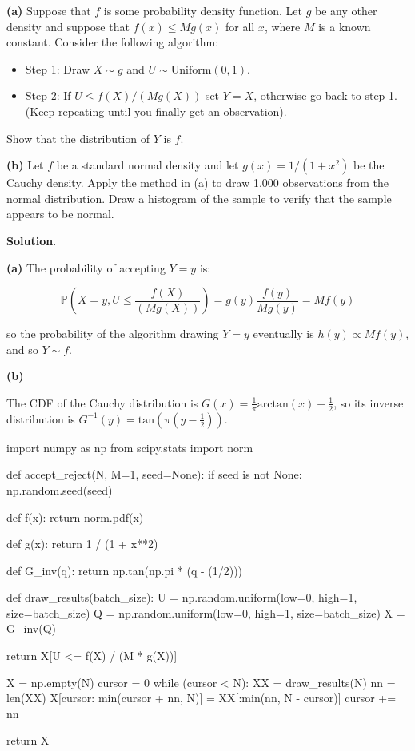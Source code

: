 \textbf{(a)} Suppose that \(f\) is some probability density function.
Let \(g\) be any other density and suppose that \(f(x) \leq M g(x)\) for
all \(x\), where \(M\) is a known constant. Consider the following
algorithm:

\begin{itemize}[tightlist]
\item
  Step 1: Draw \(X \sim g\) and \(U \sim \text{Uniform}(0, 1)\).
\item
  Step 2: If \(U \leq f(X) / (M g(X))\) set \(Y = X\), otherwise go back
  to step 1. (Keep repeating until you finally get an observation).
\end{itemize}

Show that the distribution of \(Y\) is \(f\).

\textbf{(b)} Let \(f\) be a standard normal density and let
\(g(x) = 1 / (1 + x^{2})\) be the Cauchy density. Apply the method in (a)
to draw 1,000 observations from the normal distribution. Draw a
histogram of the sample to verify that the sample appears to be normal.

\textbf{Solution}.

\textbf{(a)} The probability of accepting \(Y = y\) is:

\[ \mathbb{P}\left(X = y, U \leq \frac{f(X)}{(M g(X))} \right) = g(y) \frac{f(y)}{M g(y)} = M f(y) \]

so the probability of the algorithm drawing \(Y = y\) eventually is
\(h(y) \propto M f(y)\), and so \(Y \sim f\).

\textbf{(b)}

The CDF of the Cauchy distribution is
\(G(x) = \frac{1}{\pi} \text{arctan}\left( x \right) + \frac{1}{2}\), so
its inverse distribution is
\(G^{-1}(y) = \text{tan} \left( \pi \left( y - \frac{1}{2} \right) \right)\).

\begin{python}
import numpy as np
from scipy.stats import norm

def accept_reject(N, M=1, seed=None):
    if seed is not None:
        np.random.seed(seed)
        
    def f(x):
        return norm.pdf(x)

    def g(x):
        return 1 / (1 + x**2)
    
    def G_{i}nv(q):
        return np.tan(np.pi * (q - (1/2)))
        
    def draw_results(batch_size): 
        U = np.random.uniform(low=0, high=1, size=batch_size)
        Q = np.random.uniform(low=0, high=1, size=batch_size)
        X = G_{i}nv(Q)

        return X[U <= f(X) / (M * g(X))]
    
    X = np.empty(N)
    cursor = 0
    while (cursor < N):
        XX = draw_results(N)
        nn = len(XX)
        X[cursor: min(cursor + nn, N)] = XX[:min(nn, N - cursor)]
        cursor += nn
    
    return X
\end{python}


